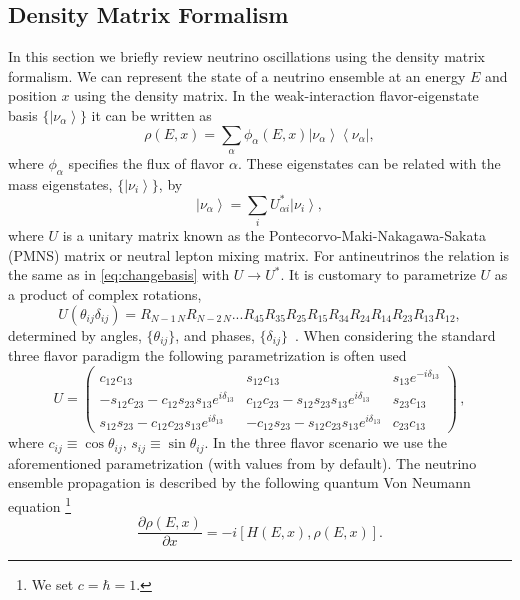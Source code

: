 \documentclass[3p,12pt]{elsarticle}
\newcommand{\bra}[1]{\ensuremath{\left\langle#1\right|}}
\newcommand{\ket}[1]{\ensuremath{\left|#1\right\rangle}}
\newcommand{\pa}[2]{\frac{\partial #1}{\partial #2}}
\begin{document}
\subsection{Density Matrix Formalism}
\label{sec:theory} 
In this section we briefly review neutrino oscillations
using the density matrix formalism.
We can represent the state of a neutrino ensemble at an energy $E$
and position $x$ using the density matrix. In the weak-interaction flavor-eigenstate basis
$\{\ket{\nu_\alpha}\}$  it can be written as
\begin{equation}
\rho(E,x) = \sum_\alpha \phi_\alpha(E,x) \ket{\nu_\alpha}\bra{\nu_\alpha} , 
\label{eq:state}
\end{equation}
where $\phi_\alpha$ specifies the flux of flavor $\alpha$.
These eigenstates can be related with the mass eigenstates,  $\{ \ket{\nu_i}  \}$, by
\begin{equation}
\ket{\nu_\alpha} = \sum_i U^*_{\alpha i} \ket{\nu_i} ,
\label{eq:changebasis}
\end{equation}
where $U$ is a unitary matrix known as the Pontecorvo-Maki-Nakagawa-Sakata (PMNS)
matrix or neutral lepton mixing matrix. For antineutrinos the relation
is the same as in 
\eqref{eq:changebasis} with $U \to U^*$.
It is customary to parametrize $U$ as a product of complex rotations,
\begin{equation}
\label{eq:mixing}
U(\theta_{ij}\delta_{ij})=R_{N-1\, N} R_{N-2\, N} ... R_{45} R_{35} R_{25} R_{15}
R_{34} R_{24} R_{14} R_{23} R_{13} R_{12}, 
\end{equation}
determined by angles, $\{\theta_{ij}\}$, and phases, $\{ \delta_{ij}
\}$~\cite{SQUIDS}. When considering the standard three flavor paradigm
the following parametrization is often used
\begin{equation}
U
=
\begin{pmatrix}
c_{12} c_{13} & s_{12} c_{13} & s_{13} e^{-i\delta_{13}} \\ 
- s_{12} c_{23} - c_{12} s_{23} s_{13} e^{i\delta_{13}} & c_{12} c_{23} - s_{12} s_{23} s_{13} e^{i\delta_{13}} & s_{23} c_{13} \\
s_{12}s_{23} -c_{12}c_{23}s_{13}e^{i\delta_{13}} & - c_{12} s_{23} - s_{12} c_{23} s_{13} e^{i\delta_{13}} & c_{23} c_{13}
\end{pmatrix}
\,,
\label{eq:U}
\end{equation}
where $c_{ij} \equiv \cos \theta_{ij}$, $s_{ij} \equiv \sin \theta_{ij}$. In the
three flavor scenario we use the aforementioned parametrization (with
values from \citep{Esteban:2016qun} by default).
The neutrino ensemble propagation is
described by the following quantum Von Neumann equation \footnote{We set $c = \hbar = 1$.} 
\begin{equation}
\pa{\rho(E,x)}{x} = -i [ H (E,x), \rho(E,x) ].
\label{eq:schrodinger}
\end{equation}
\end{document}
